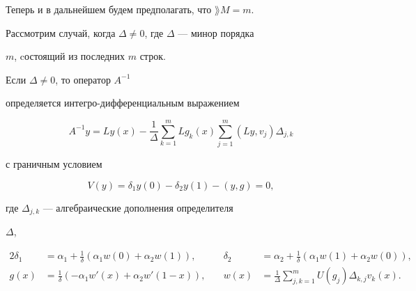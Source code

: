 Теперь и в дальнейшем будем предполагать, что $\rang M=m$.


Рассмотрим случай, когда $\Delta\ne 0$, где $\Delta$ --- минор порядка


$m$, cостоящий из последних $m$ строк.





\begin{thm}


Если $\Delta\ne 0$, то оператор $A^{-1}$


определяется интегро-дифференциальным выражением


\begin{equation}


A^{-1}y=Ly(x)-\frac1\Delta\sum\limits_{k=1}^mLg_k(x)\sum\limits_{j=1}^m


(Ly,v_j)\Delta_{j,k}


\end{equation}


с граничным условием


\begin{equation}


V(y)=\delta_1y(0)-\delta_2y(1)-(y,g)=0,


\end{equation}


где $\Delta_{j,k}$ --- алгебраические дополнения определителя


$\Delta$,


\begin{alignat*}{2}


\delta_1&=\alpha_1+\frac1\delta(\alpha_1w(0)+\alpha_2w(1)),


&\quad \delta_2&=\alpha_2+\frac1\delta(\alpha_1w(1)+\alpha_2w(0)),\\


%


g(x)&=\frac1\delta(-\alpha_1w'(x)+\alpha_2w'(1-x)),&\quad


w(x)&=\frac1\Delta\sum\limits_{j,k=1}^m U(g_j)\Delta_{k,j}v_k(x).


\end{alignat*}


\end{thm}





